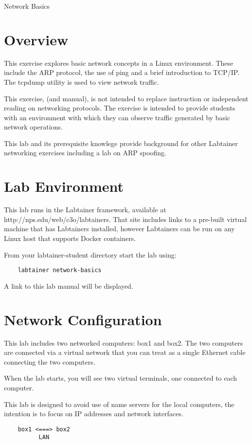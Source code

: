 


\begin{center}
{\LARGE Network Basics}
\vspace{0.1in}\\
\end{center}

\section{Overview}
This exercise explores basic network concepts 
in a Linux environment.  These include the ARP protocol,
the use of ping and a brief introduction to TCP/IP.  The tcpdump utility is
used to view network traffic.

This exercise, (and manual), is not intended to replace instruction
or independent reading on networking protocols.
The exercise is intended to provide
students with an environment with which they can observe 
traffic generated by basic network operations.

This lab and its prerequisite knowlege provide background for other Labtainer networking exercises 
including a lab on ARP spoofing.

\section{Lab Environment}
This lab runs in the Labtainer framework,
available at http://nps.edu/web/c3o/labtainers.
That site includes links to a pre-built virtual machine
that has Labtainers installed, however Labtainers can
be run on any Linux host that supports Docker containers.

From your labtainer-student directory start the lab using:
\begin{verbatim}
    labtainer network-basics
\end{verbatim}
\noindent A link to this lab manual will be displayed.  

\section{Network Configuration}
This lab includes two networked computers: box1 and box2. The two computers
are connected via a virtual network that you can treat as a single Ethernet
cable connecting the two computers. 
 
When the lab starts, you will see two virtual terminals, one connected to each
computer.  

This lab is designed to avoid use of name servers for the local computers, the intention is to focus
on IP addresses and network interfaces.
\begin{verbatim}
    box1 <===> box2
          LAN
\end{verbatim}


